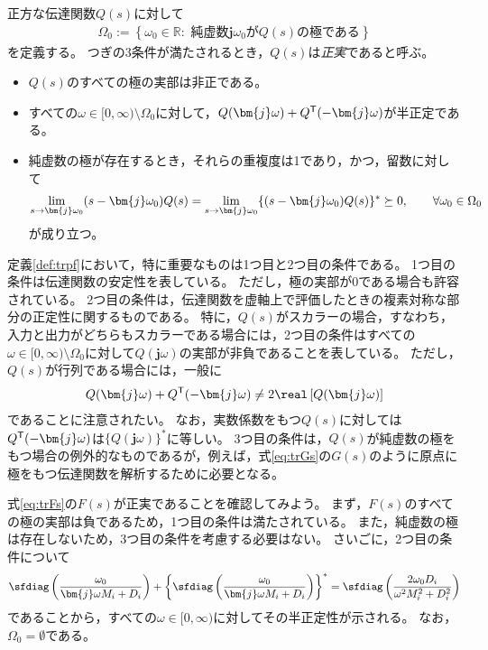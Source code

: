 \documentclass[tombow,dvipdfmx]{corona-a5}
\begin{document}
\begin{定義}\label{def:trpf}
正方な伝達関数$Q(s)$に対して
\begin{align}\label{eq:defOm0}
\Omega_0 := \left\{
\omega_0 \in \mathbb{R}: 
\mbox{ 純虚数$\bm{j} \omega_0$が$Q(s)$の極である}
\right\}
\end{align}
を定義する。
つぎの3条件が満たされるとき，$Q(s)$は\emph{正実}であると呼ぶ。
\begin{itemize}
\item $Q(s)$のすべての極の実部は非正である。
\item すべての$\omega \in [0,\infty)\setminus \Omega_0$に対して，$Q(\bm{j} \omega) + Q^{\sf T}(-\bm{j} \omega)$が半正定である。
\item 純虚数の極が存在するとき，それらの重複度は1であり，かつ，留数に対して
\begin{align*}
\lim_{s \rightarrow \bm{j} \omega_0} (s-\bm{j} \omega_0) Q(s) = \lim_{s\rightarrow \bm{j} \omega_0} \{ (s-\bm{j} \omega_0) Q(s)\}^{\sf *}\succeq 0
,\qquad
\forall \omega_0 \in \Omega_0
\end{align*}
が成り立つ。
\end{itemize}
\end{定義}

定義\ref{def:trpf}において，特に重要なものは1つ目と2つ目の条件である。
1つ目の条件は伝達関数の安定性を表している。
ただし，極の実部が0である場合も許容されている。
2つ目の条件は，伝達関数を虚軸上で評価したときの複素対称な部分の正定性に関するものである。
特に，$Q(s)$がスカラーの場合，すなわち，入力と出力がどちらもスカラーである場合には，2つ目の条件はすべての$\omega \in [0,\infty)\setminus \Omega_0$に対して$Q(\bm{j}\omega)$の実部が非負であることを表している。
ただし，$Q(s)$が行列である場合には，一般に
\begin{align*}
Q(\bm{j} \omega) + Q^{\sf T}(-\bm{j} \omega) \neq 2 \real\left[ Q(\bm{j} \omega) \right]
\end{align*}
であることに注意されたい。
なお，実数係数をもつ$Q(s)$に対しては$Q^{\sf T}( -\bm{j} \omega)$は$\{Q(\bm{j} \omega)\}^*$に等しい。
3つ目の条件は，$Q(s)$が純虚数の極をもつ場合の例外的なものであるが，例えば，式\ref{eq:trGs}の$G(s)$のように原点に極をもつ伝達関数を解析するために必要となる。

\begin{例}\label{ex:Fspr1}
式\ref{eq:trFs}の$F(s)$が正実であることを確認してみよう。
まず，$F(s)$のすべての極の実部は負であるため，1つ目の条件は満たされている。
また，純虚数の極は存在しないため，3つ目の条件を考慮する必要はない。
さいごに，2つ目の条件について
\begin{align*}
\sfdiag \left( 
\frac{\omega_0}{ \bm{j} \omega M_i + D_i}
\right)
+
\left\{
\sfdiag \left( 
\frac{\omega_0}{\bm{j} \omega M_i + D_i}
\right)
\right\}^*
=
\sfdiag \left( 
\frac{2 \omega_0 D_i}{\omega^2 M_i^2 + D_i^2}
\right)
\end{align*}
であることから，すべての$\omega\in [0,\infty)$に対してその半正定性が示される。
なお，$\Omega_0=\emptyset$である。
\end{例}
\end{document}
